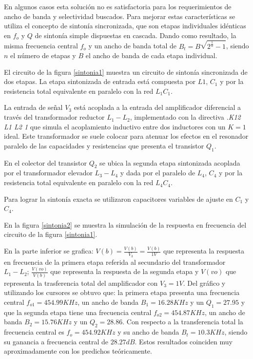  En algunos casos esta solución no es satisfactoria para los requerimientos de ancho de banda y selectividad buscados. Para mejorar estas características se utiliza el concepto de sintonía sincronizada, que son etapas individuales idénticas en $f_o$ y $Q$ de sintonía simple dispuestas en cascada. Dando como resultado, la misma frecuencia central $f_o$ y un ancho de banda total de $B_t=B\sqrt{2^{\frac{1}{n}}-1}$, siendo $n$ el número de etapas y $B$ el ancho de banda de cada etapa individual.
 
 El circuito de la figura \ref{sintonia1} muestra un circuito de sintonía sincronizada de dos etapas. La etapa sintonizada de entrada está compuesta por $L1$, $C_1$ y por la resistencia total equivalente en paralelo con la red $L_1C_1$. 
 
 La entrada de señal $V_3$ está acoplada a la entrada del amplificador diferencial a través del transformador reductor $L_1-L_2$, implementado con la directiva \emph{.K12 L1 L2 1} que simula el acoplamiento inductivo entre dos inductores con un $K=1$ ideal. Este transformador se suele colocar para atenuar los efectos en el resonador paralelo de las capacidades y resistencias que presenta el transistor $Q_1$.
 
 En el colector del transistor $Q_2$ se ubica la segunda etapa sintonizada acoplada por el transformador elevador $L_3-L_4$ y dada por el paralelo de $L_4$, $C_4$ y por la resistencia total equivalente en paralelo con la red $L_4C_4$. 
 
 Para lograr la sintonía exacta se utilizaron capacitores variables
de ajuste en $C_1$ y $C_4$.
 
 En la figura \ref{sintonia2} se muestra la simulación de la respuesta en frecuencia del circuito de la figura \ref{sintonia1}. 
 
 En la parte inferior se grafica: $V(b)=\displaystyle \frac{V(b)}{V_3}=\displaystyle \frac{V(b)}{1V}$ que representa la respuesta en frecuencia de la primera etapa referida al secundario del transformador $L_1-L_2$; $\displaystyle \frac{V(vo)}{V(b)}$ que representa la respuesta de la segunda etapa y $V(vo)$ que representa la trasferencia total del amplificador con $V_3=1V$. Del gráfico y utilizando los cursores se obtuvo que: la primera etapa presenta una frecuencia central $f_{o1}=454.99KHz$, un ancho de banda $B_1=16.28KHz$ y un $Q_1=27.95$ y que la segunda etapa tiene una frecuencia central $f_{o2}=454.87KHz$, un ancho de banda $B_2=15.76KHz$ y un $Q_2=28.86$. Con respecto a la transferencia total la frecuencia central es $f_{o}=454.92KHz$ y su ancho de banda $B_t=10.3KHz$, siendo su ganancia a frecuencia central de $28.27dB$. Estos resultados coinciden muy aproximadamente con los predichos teóricamente.
 
